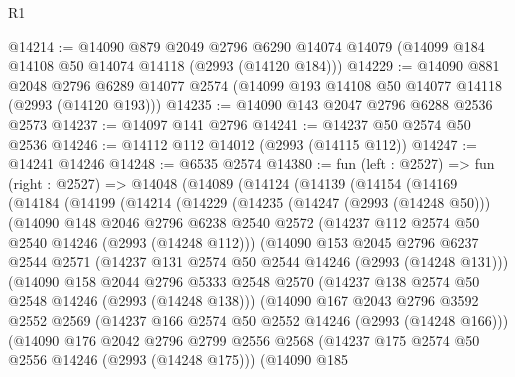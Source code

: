 \begin{lexlean}{R1}
\begin{coremodule}
@14214 := @14090
    @879
    @2049
    @2796
    @6290
    @14074
    @14079
    (@14099 @184 @14108 @50 @14074 @14118 (@2993 (@14120 @184)))
@14229 := @14090
    @881
    @2048
    @2796
    @6289
    @14077
    @2574
    (@14099 @193 @14108 @50 @14077 @14118 (@2993 (@14120 @193)))
@14235 := @14090 @143 @2047 @2796 @6288 @2536 @2573
@14237 := @14097 @141 @2796
@14241 := @14237 @50 @2574 @50 @2536
@14246 := @14112 @112 @14012 (@2993 (@14115 @112))
@14247 := @14241 @14246
@14248 := @6535 @2574
@14380 := fun (left : @2527) =>
  fun (right : @2527) =>
  @14048
    (@14089
      (@14124
        (@14139
          (@14154
            (@14169
              (@14184
                (@14199
                  (@14214
                    (@14229
                      (@14235
                        (@14247 (@2993 (@14248 @50)))
                        (@14090
                          @148
                          @2046
                          @2796
                          @6238
                          @2540
                          @2572
                          (@14237 @112 @2574 @50 @2540 @14246 (@2993 (@14248 @112)))
                          (@14090
                            @153
                            @2045
                            @2796
                            @6237
                            @2544
                            @2571
                            (@14237 @131 @2574 @50 @2544 @14246 (@2993 (@14248 @131)))
                            (@14090
                              @158
                              @2044
                              @2796
                              @5333
                              @2548
                              @2570
                              (@14237 @138 @2574 @50 @2548 @14246 (@2993 (@14248 @138)))
                              (@14090
                                @167
                                @2043
                                @2796
                                @3592
                                @2552
                                @2569
                                (@14237 @166 @2574 @50 @2552 @14246 (@2993 (@14248 @166)))
                                (@14090
                                  @176
                                  @2042
                                  @2796
                                  @2799
                                  @2556
                                  @2568
                                  (@14237 @175 @2574 @50 @2556 @14246 (@2993 (@14248 @175)))
                                  (@14090
                                    @185

\end{coremodule}
\end{lexlean}
